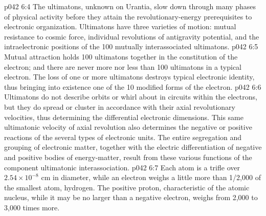 \vs p042 6:4 \pc The ultimatons, unknown on Urantia, slow down through many phases of physical activity before they attain the revolutionary\hyp{}energy prerequisites to electronic organization. Ultimatons have three varieties of motion: mutual resistance to cosmic force, individual revolutions of antigravity potential, and the intraelectronic positions of the 100 mutually interassociated ultimatons.
\vs p042 6:5 Mutual attraction holds 100 ultimatons together in the constitution of the electron; and there are never more nor less than 100 ultimatons in a typical electron. The loss of one or more ultimatons destroys typical electronic identity, thus bringing into existence one of the 10 modified forms of the electron.
\vs p042 6:6 Ultimatons do not describe orbits or whirl about in circuits within the electrons, but they do spread or cluster in accordance with their axial revolutionary velocities, thus determining the differential electronic dimensions. This same ultimatonic velocity of axial revolution also determines the negative or positive reactions of the several types of electronic units. The entire segregation and grouping of electronic matter, together with the electric differentiation of negative and positive bodies of energy\hyp{}matter, result from these various functions of the component ultimatonic interassociation.
\vs p042 6:7 \pc Each atom is a trifle over $2.54 \times 10^{-8}$ cm in diameter, while an electron weighs a little more than 1/2,000 of the smallest atom, hydrogen. The positive proton, characteristic of the atomic nucleus, while it may be no larger than a negative electron, weighs from 2,000 to 3,000 times more.
